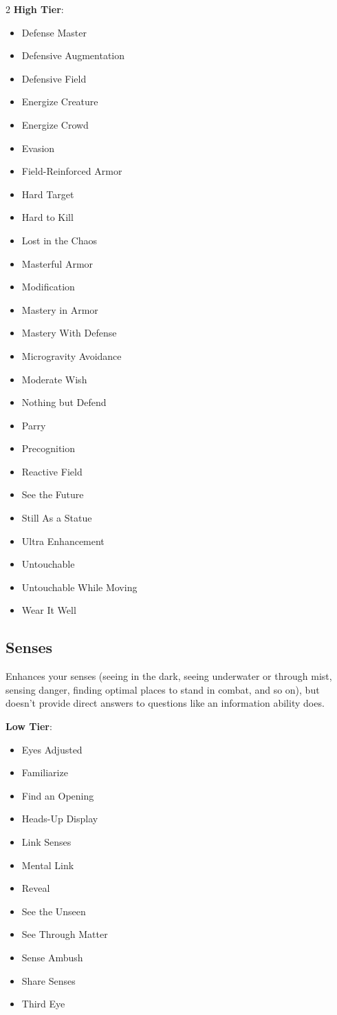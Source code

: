 \begin{multicols}{2}
\textbf{High Tier}:

\begin{itemize}
\item Defense Master
\item Defensive Augmentation
\item Defensive Field
\item Energize Creature
\item Energize Crowd
\item Evasion
\item Field-Reinforced Armor
\item Hard Target
\item Hard to Kill
\item Lost in the Chaos
\item Masterful Armor
\item Modification
\item Mastery in Armor
\item Mastery With Defense
\item Microgravity Avoidance
\item Moderate Wish
\item Nothing but Defend
\item Parry
\item Precognition
\item Reactive Field
\item See the Future
\item Still As a Statue
\item Ultra Enhancement
\item Untouchable
\item Untouchable While Moving
\item Wear It Well
\end{itemize}

\subsection{Senses}

Enhances your senses (seeing in the dark, seeing underwater or through mist, sensing danger, finding optimal places to stand in combat, and so on), but doesn’t provide direct answers to questions like an information ability does.

\textbf{Low Tier}:

\begin{itemize}
\item Eyes Adjusted
\item Familiarize
\item Find an Opening
\item Heads-Up Display
\item Link Senses
\item Mental Link
\item Reveal
\item See the Unseen
\item See Through Matter
\item Sense Ambush
\item Share Senses
\item Third Eye
\end{itemize}


\end{multicols}
